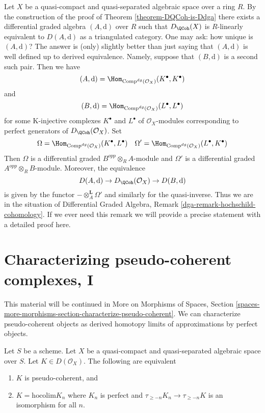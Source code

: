 \begin{remark}
\label{remark-independence-choice}
Let $X$ be a quasi-compact and quasi-separated algebraic space over a ring $R$.
By the construction of the proof of
Theorem \ref{theorem-DQCoh-is-Ddga}
there exists a differential graded algebra $(A, \text{d})$ over $R$
such that $D_\QCoh(X)$ is $R$-linearly equivalent to
$D(A, \text{d})$ as a triangulated category.
One may ask: how unique is $(A, \text{d})$?
The answer is (only) slightly better than just saying that
$(A, \text{d})$ is well defined up to derived equivalence.
Namely, suppose that $(B, \text{d})$ is a second such pair.
Then we have
$$
(A, \text{d}) = \Hom_{\text{Comp}^{dg}(\mathcal{O}_X)}(K^\bullet, K^\bullet)
$$
and
$$
(B, \text{d}) = \Hom_{\text{Comp}^{dg}(\mathcal{O}_X)}(L^\bullet, L^\bullet)
$$
for some K-injective complexes $K^\bullet$ and $L^\bullet$
of $\mathcal{O}_X$-modules corresponding to perfect generators
of $D_\QCoh(\mathcal{O}_X)$. Set
$$
\Omega = \Hom_{\text{Comp}^{dg}(\mathcal{O}_X)}(K^\bullet, L^\bullet)
\quad
\Omega' = \Hom_{\text{Comp}^{dg}(\mathcal{O}_X)}(L^\bullet, K^\bullet)
$$
Then $\Omega$ is a differential graded $B^{opp} \otimes_R A$-module
and $\Omega'$ is a differential graded $A^{opp} \otimes_R B$-module.
Moreover, the equivalence
$$
D(A, \text{d}) \to D_\QCoh(\mathcal{O}_X) \to
D(B, \text{d})
$$
is given by the functor $- \otimes_A^\mathbf{L} \Omega'$ and
similarly for the quasi-inverse. Thus we are in the situation
of Differential Graded Algebra, Remark \ref{dga-remark-hochschild-cohomology}.
If we ever need this remark we will provide a precise statement
with a detailed proof here.
\end{remark}











\section{Characterizing pseudo-coherent complexes, I}
\label{section-pseudo-coherent-hocolim}

\noindent
This material will be continued in More on Morphisms of Spaces, Section
\ref{spaces-more-morphisms-section-characterize-pseudo-coherent}.
We can characterize pseudo-coherent
objects as derived homotopy limits of approximations by perfect objects.

\begin{lemma}
\label{lemma-pseudo-coherent-hocolim}
Let $S$ be a scheme.
Let $X$ be a quasi-compact and quasi-separated algebraic space over $S$.
Let $K \in D(\mathcal{O}_X)$. The following are equivalent
\begin{enumerate}
\item $K$ is pseudo-coherent, and
\item $K = \text{hocolim} K_n$ where
$K_n$ is perfect and $\tau_{\geq -n}K_n \to \tau_{\geq -n}K$
is an isomorphism for all $n$.
\end{enumerate}
\end{lemma}

